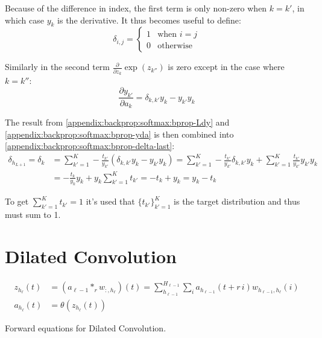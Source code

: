 Because of the difference in index, the first term is only non-zero when $k = k'$, in which case $y_k$ is the derivative. It thus becomes useful to define:
\begin{equation}
\delta_{i,j} = \begin{cases}1& \text{when } i = j \\ 0 & \text{otherwise}\end{cases}
\end{equation}

Similarly in the second term $\frac{\partial}{\partial z_k} \exp(z_{k''})$ is zero except in the case where $k = k''$:
\begin{equation}
\frac{\partial y_{k'}}{\partial a_k} = \delta_{k, k'} y_k - y_{k'} y_k
\label{appendix:backprop:softmax:bprop-yda}
\end{equation}

The result from \eqref{appendix:backprop:softmax:bprop-Ldy} and \eqref{appendix:backprop:softmax:bprop-yda} is then combined into \eqref{appendix:backprop:softmax:bprop-delta-last}:
\begin{equation}
\begin{aligned}
\delta_{h_{L + 1}} = \delta_k &= \sum_{k'=1}^K -\frac{t_{k'}}{y_{k'}} \left( \delta_{k, k'} y_k - y_{k'} y_k \right) = \sum_{k'=1}^K -\frac{t_{k'}}{y_{k'}} \delta_{k, k'} y_k + \sum_{k'=1}^K \frac{t_{k'}}{y_{k'}} y_{k'} y_k \\
&= -\frac{t_k}{y_k} y_k + y_k \sum_{k'=1}^K t_{k'} = -t_k + y_k = y_k - t_k
\end{aligned}
\label{appendix:backprop:softmax:bprop-deltaKfinal}
\end{equation}

To get $\sum_{k'=1}^K t_{k'} = 1$ it's used that $\{ t_{k'} \}_{k'=1}^K$ is the target distribution and thus must sum to 1.

\clearpage
\section{Dilated Convolution}
\label{appendix:backward-pass:dilated-convolution}

\begin{equationbox}[H]
\begin{equation*}
\begin{aligned}
z_{h_\ell}(t) &= (a_{\ell-1} *_r w_{:, h_\ell})(t) = \sum_{h_{\ell-1}}^{H_{\ell-1}} \sum_{i} a_{h_{\ell-1}}(t + r\,i) w_{h_{\ell-1}, h_\ell}(i) \\
a_{h_\ell}(t) &= \theta(z_{h_\ell}(t))
\end{aligned}
\end{equation*}

\clearpage
\caption{Forward equations for Dilated Convolution.}
\end{equationbox}

